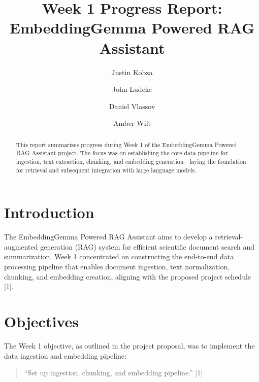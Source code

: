 \documentclass[sigconf]{acmart}
\begin{document}
\title{Week 1 Progress Report: EmbeddingGemma Powered RAG Assistant}

\author{Justin Kobza}

\author{John Ludeke}

\author{Daniel Vlassov}

\author{Amber Wilt}

\renewcommand{\shortauthors}{Kobza et al.}

\begin{abstract}
This report summarizes progress during Week 1 of the EmbeddingGemma Powered RAG Assistant project. The focus was on establishing the core data pipeline for ingestion, text extraction, chunking, and embedding generation—laying the foundation for retrieval and subsequent integration with large language models.
\end{abstract}


\maketitle

\section{Introduction}
The EmbeddingGemma Powered RAG Assistant aims to develop a retrieval-augmented generation (RAG) system for efficient scientific document search and summarization. Week 1 concentrated on constructing the end-to-end data processing pipeline that enables document ingestion, text normalization, chunking, and embedding creation, aligning with the proposed project schedule [1].

\section{Objectives}
The Week 1 objective, as outlined in the project proposal, was to implement the data ingestion and embedding pipeline:
\begin{quote}
``Set up ingestion, chunking, and embedding pipeline.'' [1]
\end{quote}
\end{document}
